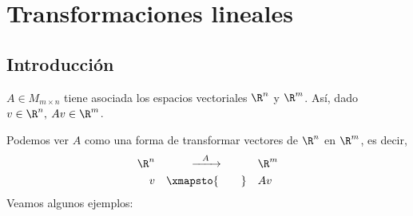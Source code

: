 \section{Transformaciones lineales}

\subsection{Introducción}

$A\in M_{m\times n}$ tiene asociada los espacios vectoriales $\R^n$ y $\R^m$. Así, dado $v\in\R^n,\: Av\in\R^m$.

Podemos ver $A$ como una forma de transformar vectores de $\R^n$ en $\R^m$, es decir, \[ \begin{array}{rcl}
	\R^n&\xrightarrow[\qquad]{A}&\R^m\\
	v&\xmapsto{\qquad} &Av
\end{array} \]
Veamos algunos ejemplos:
